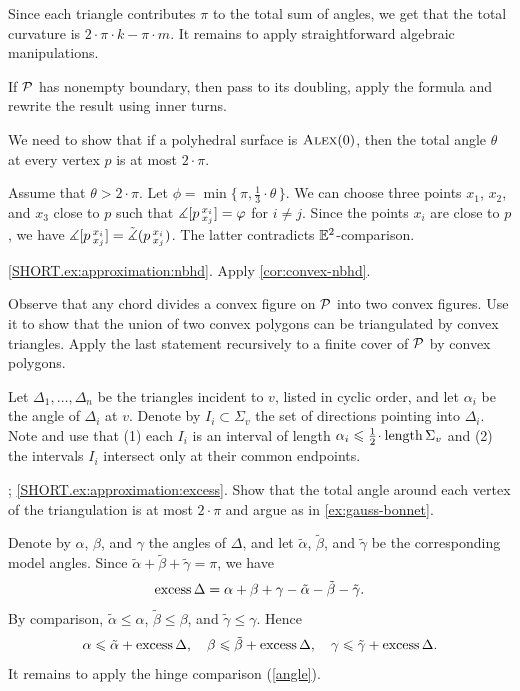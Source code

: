 Since each triangle contributes $\pi$ to the total sum of angles, we get that the total curvature is $2\cdot\pi\cdot k-\pi\cdot m$.
It remains to apply straightforward algebraic manipulations.

If $\mathcal{P}$ has nonempty boundary, then pass to its doubling, apply the formula and rewrite the result using inner turns.

We need to show that if a polyhedral surface is $\textup{\textsc{Alex}}(0)$, then the total angle $\theta$ at every vertex $p$ is at most $2\cdot\pi$.

Assume that $\theta>2\cdot\pi$.
Let $\phi=\min\{\,\pi,\tfrac13\cdot\theta\,\}$.
We can choose three points $x_1$, $x_2$, and $x_3$ close to $p$ such that
$\measuredangle [p\,{}^{x_i}_{x_j}]=\varphi$ for $i\ne j$.
Since the points $x_i$ are close to $p$, we have $\measuredangle [p\,{}^{x_i}_{x_j}]=\tilde\measuredangle(p\,{}^{x_i}_{x_j})$.
The latter contradicts $\mathbb{E}^2$-comparison.

\ref{SHORT.ex:approximation:nbhd}.
Apply \ref{cor:convex-nbhd}.

Observe that any chord divides a convex figure on $\mathcal{P}$ into two convex figures.
Use it to show that the union of two convex polygons can be triangulated by convex triangles.
Apply the last statement recursively to a finite cover of $\mathcal{P}$ by convex polygons.

Let $\Delta_1,\dots,\Delta_n$ be the triangles incident to $v$, listed in cyclic order, and let $\alpha_i$ be the angle of $\Delta_i$ at $v$.
Denote by $I_i\subset\Sigma_v$ the set of directions pointing into $\Delta_i$.
Note and use that (1) each $I_i$ is an interval of length $\alpha_i\le\tfrac12\cdot\length\Sigma_v$ and (2)
the intervals $I_i$ intersect only at their common endpoints.

\parbf{\ref{ex:approximation}}; \ref{SHORT.ex:approximation:excess}.
Show that the total angle around each vertex of the triangulation is at most $2\cdot\pi$ and argue as in \ref{ex:gauss-bonnet}.

Denote by $\alpha$, $\beta$, and $\gamma$ the angles of $\Delta$, and let
$\tilde\alpha$, $\tilde\beta$, and $\tilde\gamma$ be the corresponding model angles.
Since $\tilde\alpha+\tilde\beta+\tilde\gamma=\pi$, we have
\[
\operatorname{\rm excess}\nolimits\Delta
=
\alpha+\beta+\gamma
-\tilde\alpha-\tilde\beta-\tilde\gamma.
\]
By comparison, $\tilde\alpha\le\alpha$, $\tilde\beta\le\beta$, and $\tilde\gamma\le\gamma$.
Hence
\[\alpha\leqslant\tilde\alpha+\operatorname{\rm excess}\nolimits\Delta,\quad
\beta\leqslant\tilde\beta+\operatorname{\rm excess}\nolimits\Delta,\quad
\gamma\leqslant\tilde\gamma+\operatorname{\rm excess}\nolimits\Delta.
\]
It remains to apply the hinge comparison (\ref{angle}).

